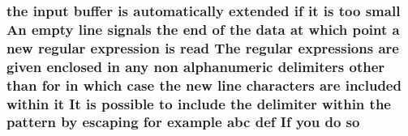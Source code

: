 \subsubsection[{\texorpdfstring{so}{so}}]{\setlength{\rightskip}{0pt plus 5cm}the {\bf input} {\bf buffer} {\bf is} automatically extended {\bf if} {\bf it} {\bf is} too small An {\bf empty} {\bf line} signals the {\bf end} {\bf of} the {\bf data} at {\bf which} {\bf point} {\bf a} new regular {\bf expression} {\bf is} {\bf read} The regular {\bf expressions} {\bf are} {\bf given} enclosed {\bf in} {\bf any} non {\bf alphanumeric} delimiters other {\bf than} for {\bf in} {\bf which} {\bf case} the new {\bf line} {\bf characters} {\bf are} {\bf included} within {\bf it} It {\bf is} {\bf possible} {\bf to} {\bf include} the delimiter within the {\bf pattern} by escaping for {\bf example} {\bf abc} def If you {\bf do} so}\hypertarget{pcretest_8txt_a35e1c9bd1e24f3f31253ab761f792055}{}\label{pcretest_8txt_a35e1c9bd1e24f3f31253ab761f792055}
